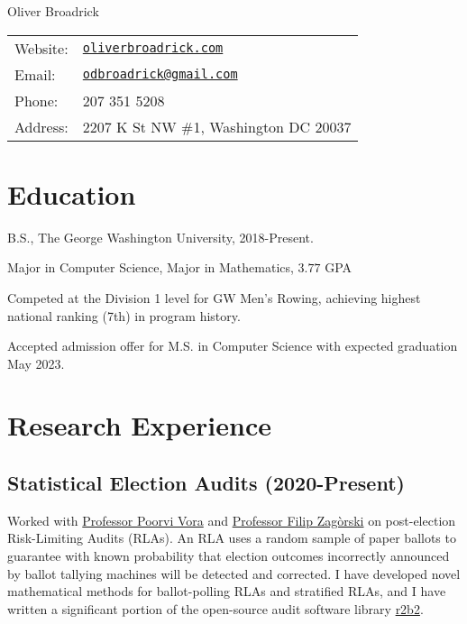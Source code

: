 \documentclass[letterpaper]{article}
\def\name{Oliver Broadrick}
\renewenvironment{itemize}{
  \begin{list}{}{
    \setlength{\leftmargin}{1.5em}
  }
}{
  \end{list}
}
\begin{document}
{\huge \name}

\vspace{0.25in}

\begin{minipage}{0.45\linewidth}
  \begin{tabular}{ll}
    Website: & \href{https://oliverbroadrick.com/}{\tt oliverbroadrick.com} \\
    Email: & \href{mailto:odbroadrick@gmail.com}{\tt odbroadrick@gmail.com} \\
    Phone: & 207 351 5208 \\
    Address: & 2207 K St NW \#1, Washington DC 20037
  \end{tabular}
\end{minipage}


\section*{Education}

\begin{itemize}

\item B.S., The George Washington University, 2018-Present.
\begin{itemize}
  \item Major in Computer Science, Major in Mathematics, $3.77$ GPA
  \item Competed at the Division 1 level for GW Men's Rowing, achieving highest national ranking (7th) in program history.
  \item Accepted admission offer for M.S. in Computer Science with expected graduation May 2023.
\end{itemize}

\end{itemize}


\section*{Research Experience}

\subsection*{Statistical Election Audits (2020-Present)}
Worked with \href{https://www2.seas.gwu.edu/~poorvi/}{Professor Poorvi Vora} and 
\href{https://zagorski.im.pwr.wroc.pl/}{Professor Filip Zag\`{o}rski} on post-election
Risk-Limiting Audits (RLAs). An RLA uses a random sample of paper ballots to
guarantee with known probability 
that election outcomes incorrectly announced by ballot tallying machines will be 
detected and corrected.
I have developed novel mathematical methods for ballot-polling RLAs and stratified RLAs, 
and I have written a significant portion of the open-source audit software library 
\href{https://github.com/gwexploratoryaudits/r2b2}{r2b2}.
\end{document}
